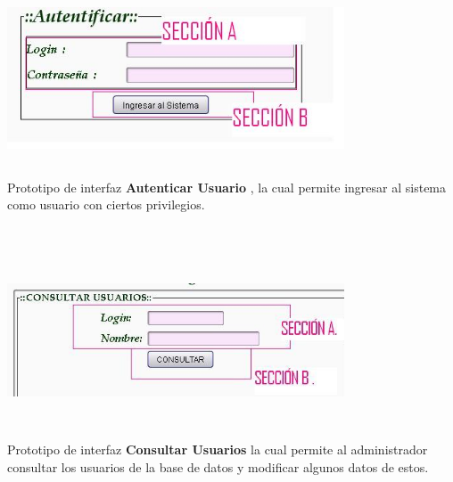 %
%

\begin{minipage}[c]{1\textwidth}
	\begin{center}
	\includegraphics[width= 10cm , height= 5cm]{prototiposGui/AUTENTICAR}
	\end{center}
	{Prototipo de interfaz {\bf Autenticar Usuario} , la cual permite ingresar al sistema como
	usuario con ciertos privilegios.}
\end{minipage}\\[1cm]

\begin{minipage}[c]{1\textwidth}
	\begin{center}
	\includegraphics[width= 10cm , height= 5cm,]{prototiposGui/consultarUsuarios}
	\end{center}
	{Prototipo de interfaz {\bf Consultar Usuarios} la cual permite al administrador consultar los
	usuarios de la base de datos y modificar algunos datos de estos.}
\end{minipage}\\[1cm]

